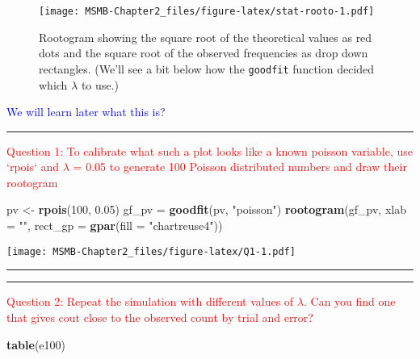 \documentclass[]{article}
\newenvironment{Shaded}{\begin{snugshade}}{\end{snugshade}}
\newcommand{\KeywordTok}[1]{\textcolor[rgb]{0.13,0.29,0.53}{\textbf{#1}}}
\newcommand{\DataTypeTok}[1]{\textcolor[rgb]{0.13,0.29,0.53}{#1}}
\newcommand{\DecValTok}[1]{\textcolor[rgb]{0.00,0.00,0.81}{#1}}
\newcommand{\FloatTok}[1]{\textcolor[rgb]{0.00,0.00,0.81}{#1}}
\newcommand{\StringTok}[1]{\textcolor[rgb]{0.31,0.60,0.02}{#1}}
\newcommand{\NormalTok}[1]{#1}
\begin{document}
\begin{figure}
\centering
\texttt{[image: MSMB-Chapter2\_files/figure-latex/stat-rooto-1.pdf]}
\caption{Rootogram showing the square root of the theoretical values as
red dots and the square root of the observed frequencies as drop down
rectangles. (We'll see a bit below how the \texttt{goodfit} function
decided which \(\lambda\) to use.)}
\end{figure}

\textcolor{blue}{We will learn later what this is?}

\begin{center}\rule{0.5\linewidth}{\linethickness}\end{center}

\textcolor{red}{Question 1: To calibrate what such a plot looks like a known poisson variable, use `rpois` and $\lambda$ = 0.05 to generate 100 Poisson distributed numbers and draw their rootogram}

\begin{Shaded}
\begin{Highlighting}[]
\NormalTok{pv <-}\StringTok{ }\KeywordTok{rpois}\NormalTok{(}\DecValTok{100}\NormalTok{, }\FloatTok{0.05}\NormalTok{)}
\NormalTok{gf_pv =}\StringTok{ }\KeywordTok{goodfit}\NormalTok{(pv, }\StringTok{"poisson"}\NormalTok{)}
\KeywordTok{rootogram}\NormalTok{(gf_pv, }\DataTypeTok{xlab =} \StringTok{""}\NormalTok{, }\DataTypeTok{rect_gp =} \KeywordTok{gpar}\NormalTok{(}\DataTypeTok{fill =} \StringTok{"chartreuse4"}\NormalTok{))}
\end{Highlighting}
\end{Shaded}

\texttt{[image: MSMB-Chapter2\_files/figure-latex/Q1-1.pdf]}

\begin{center}\rule{0.5\linewidth}{\linethickness}\end{center}

\begin{center}\rule{0.5\linewidth}{\linethickness}\end{center}

\textcolor{red}{Question 2: Repeat the simulation with different values of $\lambda$. Can you find one that gives cout close to the observed count by trial and error?}

\begin{Shaded}
\begin{Highlighting}[]
\KeywordTok{table}\NormalTok{(e100)}
\end{Highlighting}
\end{Shaded}
\end{document}
